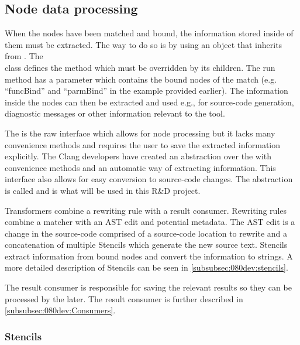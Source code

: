 \subsection{Node data processing} \label{subsec:080dev:NodeDataProcessing}

When the nodes have been matched and bound, the information stored inside of them must be extracted. The way to do so is by using an object that inherits from .
The \\ class defines the  method which must be overridden by its children. The run method has a  parameter which contains the bound nodes of the match (e.g. ``funcBind'' and ``parmBind'' in the example provided earlier).
The information inside the nodes can then be extracted and used e.g., for source-code generation, diagnostic messages or other information relevant to the tool.

The  is the raw interface which allows for node processing but it lacks many convenience methods and requires the user to save the extracted information explicitly. The Clang developers have created an abstraction over the  with convenience methods and an automatic way of extracting information. This interface also allows for easy conversion to source-code changes. The abstraction is called  and is what will be used in this R\&D project.

Transformers combine a rewriting rule with a result consumer. Rewriting rules combine a matcher with an AST edit and potential metadata. The AST edit is a change in the source-code comprised of a source-code location to rewrite and a concatenation of multiple Stencils which generate the new source text. Stencils extract information from bound nodes and convert the information to strings. A more detailed description of Stencils can be seen in \cref{subsubsec:080dev:stencils}.

The result consumer is responsible for saving the relevant results so they can be processed by the  later. The result consumer is further described in \cref{subsubsec:080dev:Consumers}.

\subsubsection*{Stencils} \label{subsubsec:080dev:stencils}

